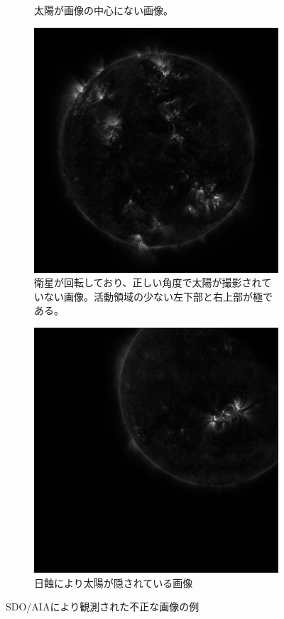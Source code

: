 \begin{figure}[htbp]
\begin{subfigure}[b]{0.48\textwidth}
        \caption{太陽が画像の中心にない画像。}
    \end {subfigure}
    \begin{subfigure}[b]{0.48\textwidth}
        \includegraphics[width=\textwidth]{figures/bad_sample2.png}
        \caption{衛星が回転しており、正しい角度で太陽が撮影されていない画像。活動領域の少ない左下部と右上部が極である。}
    \end {subfigure}
    \hfill
    \begin{subfigure}[b]{0.48\textwidth}
        \includegraphics[width=\textwidth]{figures/bad_sample1.png}
        \caption{日蝕により太陽が隠されている画像}
    \end {subfigure}
    \caption{SDO/AIAにより観測された不正な画像の例}
    \label{fig:bad_aia_samples}
\end{figure}

